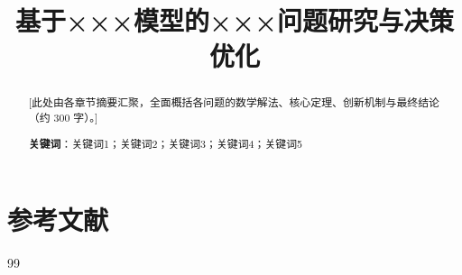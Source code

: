 \documentclass[12pt,a4paper]{article}
\title{\textbf{\LARGE 基于×××模型的×××问题研究与决策优化}}
\begin{document}
\maketitle

\begin{abstract}
[此处由各章节摘要汇聚，全面概括各问题的数学解法、核心定理、创新机制与最终结论（约 300 字）。]

\noindent\textbf{关键词}：关键词1；关键词2；关键词3；关键词4；关键词5
\end{abstract}

\newpage







\section*{参考文献}
\begin{thebibliography}{99}
\end{thebibliography}
\end{document}
